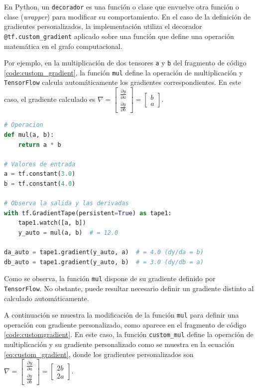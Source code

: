 En Python, un \texttt{decorador} es una función o clase que envuelve otra función o clase (\textit{wrapper}) para modificar su comportamiento. En el caso de la definición de gradientes personalizados, la implementación utiliza el decorador \texttt{@tf.custom\_gradient} aplicado sobre una función que define una operación matemática en el grafo computacional.

Por ejemplo, en la multiplicación de dos tensores \texttt{a} y \texttt{b} del fragmento de código \ref{code:custom_gradient}, la función \texttt{mul} define la operación de multiplicación y \texttt{TensorFlow} calcula automáticamente los gradientes correspondientes. En este caso, el gradiente calculado es $\nabla=\begin{bmatrix}\frac{\partial y}{\partial a} \\ \frac{\partial y}{\partial b} \end{bmatrix} = \begin{bmatrix} b \\ a \end{bmatrix}$.

\begin{lstlisting}[language=Python,label=code:mul,caption=Definición de la operación mul (gradiente automático) en TensorFlow.]
# Operacion
def mul(a, b):
    return a * b

# Valores de entrada
a = tf.constant(3.0)
b = tf.constant(4.0)

# Observa la salida y las derivadas
with tf.GradientTape(persistent=True) as tape1:
    tape1.watch([a, b])
    y_auto = mul(a, b)  # = 12.0

da_auto = tape1.gradient(y_auto, a)  # = 4.0 (dy/da = b)
db_auto = tape1.gradient(y_auto, b)  # = 3.0 (dy/db = a)
\end{lstlisting}

Como se observa, la función \texttt{mul} dispone de su gradiente definido por \texttt{TensorFlow}. No obstante, puede resultar necesario definir un gradiente distinto al calculado automáticamente.

A continuación se muestra la modificación de la función \texttt{mul} para definir una operación con gradiente personalizado, como aparece en el fragmento de código \ref{code:customgradient}. En este caso, la función \texttt{custom\_mul} define la operación de multiplicación y su gradiente personalizado como se muestra en la ecuación \ref{eq:custom_gradient}, donde los gradientes personalizados son $\nabla = \begin{bmatrix} \frac{\partial y}{\partial a} \\ \frac{\partial y}{\partial b} \end{bmatrix} = \begin{bmatrix} 2b \\ 2a \end{bmatrix}$.

